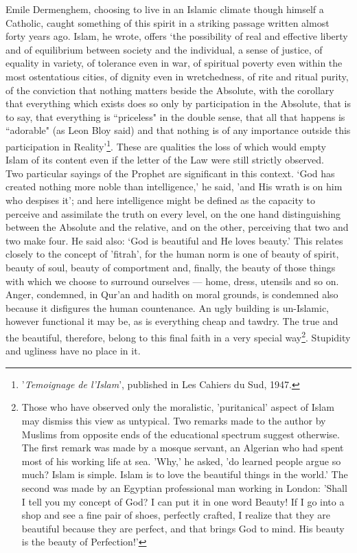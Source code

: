 \documentclass[10pt, twoside]{book}
\begin{document}
Emile Dermenghem, choosing to live in an Islamic climate though himself a Catholic, caught something 
of this spirit in a striking passage written almost forty years ago. Islam, he wrote, offers `the 
possibility of real and effective liberty and of equilibrium between society and the individual, a 
sense of justice, of equality in variety, of tolerance even in war, of spiritual poverty even within 
the most ostentatious cities, of dignity even in wretchedness, of rite and ritual purity, of the 
conviction that nothing matters beside the Absolute, with the corollary that everything which exists 
does so only by participation in the Absolute, that is to say, that everything is ``priceless" in the 
double sense, that all that happens is ``adorable" (as Leon Bloy said) and that nothing is of any 
importance outside this participation in Reality'\footnote{'\emph{Temoignage de l'Islam}', published in Les Cahiers du Sud, 1947.}. These are qualities the loss of which would empty Islam of its content even if the letter of the Law were still strictly observed. \\

Two particular sayings of the Prophet are significant in this context. `God has created nothing more 
noble than intelligence,' he said, 'and His wrath is on him who despises it'; and here intelligence 
might be defined as the capacity to perceive and assimilate the truth on every level, on the one hand 
distinguishing between the Absolute and the relative, and on the other, perceiving that two and two 
make four. He said also: `God is beautiful and He loves beauty.' This relates closely to the concept 
of 'fitrah', for the human norm is one of beauty of spirit, beauty of soul, beauty of comportment 
and, finally, the beauty of those things with which we choose to surround ourselves --- home, dress, 
utensils and so on. Anger, condemned, in Qur'an and hadith on moral grounds, is condemned also 
because it disfigures the human countenance. An ugly building is un-Islamic, however functional it may 
be, as is everything cheap and tawdry. The true and the beautiful, therefore, belong to this final 
faith in a very special way\footnote{Those who have observed only the moralistic, 'puritanical' aspect of Islam may dismiss this view as untypical. Two remarks made to the author by Muslims from opposite ends of the educational spectrum suggest otherwise. The first remark was made by a mosque servant, an Algerian who had spent most of his working life at sea. 'Why,' he asked, 'do learned people argue so much? Islam is simple. Islam is to love the beautiful things in the world.' The second was made by an Egyptian professional man working in London: 'Shall I tell you my concept of God? I can put it in one word Beauty! If I go into a shop and see a fine pair of shoes, perfectly crafted, I realize that they are beautiful because they are perfect, and that brings God to mind. His beauty is the beauty of Perfection!'}. Stupidity and ugliness have no place in it. \\
\end{document}
